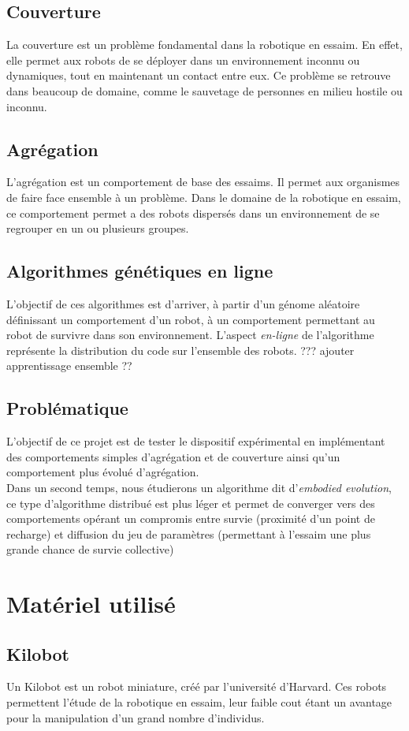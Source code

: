 \documentclass[a4paper]{article}
\begin{document}
\subsection{Couverture}
La couverture est un problème fondamental dans la robotique en essaim. En effet, elle permet aux robots de se déployer dans un environnement inconnu ou dynamiques, tout en maintenant un contact entre eux. Ce problème se retrouve dans beaucoup de domaine, comme le sauvetage de personnes en milieu hostile ou inconnu.
\subsection{Agrégation}
L'agrégation est un comportement de base des essaims. Il permet aux organismes de faire face ensemble à un problème. Dans le domaine de la robotique en essaim, ce comportement permet a des robots dispersés dans un environnement de se regrouper en un ou plusieurs groupes.
\subsection{Algorithmes génétiques en ligne}
L'objectif de ces algorithmes est d'arriver, à partir d'un génome aléatoire définissant un comportement d'un robot, à un comportement permettant au robot de survivre dans son environnement. L'aspect \textit{en-ligne} de l'algorithme représente la distribution du code sur l'ensemble des robots. ??? ajouter apprentissage ensemble ??
\subsection{Problématique}
L'objectif de ce projet est de tester le dispositif expérimental en implémentant des comportements simples d'agrégation et de couverture ainsi qu'un comportement plus évolué d'agrégation. \\Dans un second temps, nous étudierons un algorithme dit d'\textit{embodied evolution}, ce type d'algorithme distribué est plus léger et permet de converger vers des comportements opérant un compromis entre survie (proximité d'un point de recharge) et diffusion du jeu de paramètres (permettant à l'essaim une plus grande chance de survie collective)
\newpage
\section{Matériel utilisé}
\subsection{Kilobot}
Un Kilobot \cite{rubenstein_kilobot:_2012} est un robot miniature, créé par l'université d'Harvard. Ces robots permettent l'étude de la robotique en essaim, leur faible cout étant un avantage pour la manipulation d'un grand nombre d'individus.
\end{document}
